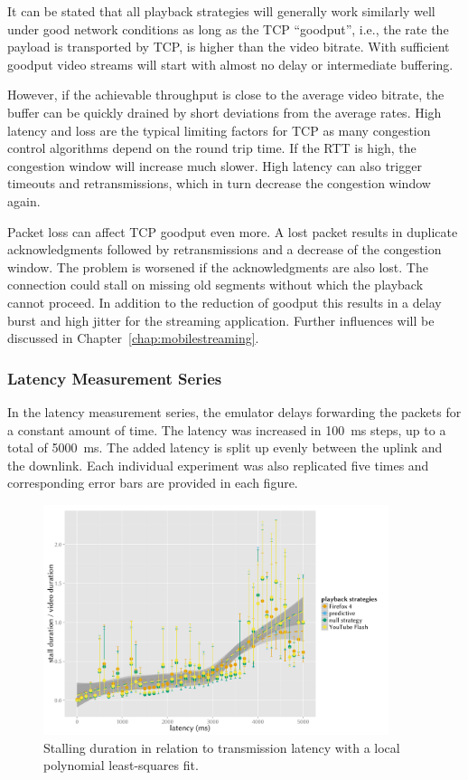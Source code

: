 It can be stated that all playback strategies will generally work similarly well under good network conditions as long as the \gls{TCP} ``goodput'', i.e., the rate the payload is transported by \gls{TCP}, is higher than the video bitrate. With sufficient goodput video streams will start with almost no delay or intermediate buffering. 

However, if the achievable throughput is close to the average video bitrate, the buffer can be quickly drained by short deviations from the average rates. High latency and loss are the typical limiting factors for \gls{TCP} as many congestion control algorithms depend on the round trip time. If the \gls{RTT} is high, the congestion window will increase much slower. High latency can also trigger timeouts and retransmissions, which in turn decrease the congestion window again. 

Packet loss can affect \gls{TCP} goodput even more. A lost packet results in duplicate acknowledgments followed by retransmissions and a decrease of the congestion window. The problem is worsened if the acknowledgments are also lost. The connection could stall on missing old segments without which the playback cannot proceed. In addition to the reduction of goodput this results in a delay burst and high jitter for the streaming application. Further influences will be discussed in Chapter~\ref{chap:mobilestreaming}.


\subsubsection{Latency Measurement Series}

In the latency measurement series, the emulator delays forwarding the packets for a constant amount of time. The latency was increased in \SI{100}{\milli\second} steps, up to a total of \SI{5000}{\milli\second}. The added latency is split up evenly between the uplink and the downlink. Each individual experiment was also replicated five times and corresponding error bars are provided in each figure.

\begin{figure}[htbp]
	\centering
	\includegraphics[width=0.9\textwidth]{images/R-playbackemulation-stallduration-latency.pdf}
	\caption{Stalling duration in relation to transmission latency with a local polynomial least-squares fit.}
\label{c3:fig:eval-latency-stallingtime}
\end{figure}

